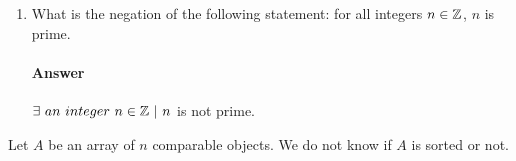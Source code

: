 \documentclass{article}
\begin{document}
\begin{enumerate}
	      \paragraph{Answer}
          \begin{proof}
	      For every integer $k \geq 1$, the complete graph on
	      $n$ vertices (denoted by the symbol~$K_n$) has $\frac{n(n-1)}{2}$~edges.
	      For each new vertex added, an edge will be connected to each existing vertex.
	      In other words, for the $n^{th}$ vertex added $n-1$ edges are added. $\frac{n(n-1)}{2}$
	      can be rewritten as $\sum^{n-1}_{k=0} k$

	      {\bf Basis:} $f(1)$ = $\frac{1 (1-1)}{2}$
	      $=\frac{1(0)}{2}$
	      $=0$

	      A graph with 1 vertex has zero edges, so this is true.

          {\bf Inductuve Step: } let $k \in \mathbb{Z}\ \|\ k_{0} = 1$ suppose that f (k) is true,
          we will show that f (k+1) is also true.

          \[ \sum^{(k+1)-1}_{j=0} j = ( \sum^{k-1}_{j=0} j ) + k\]
          \[= \frac{k(k-1)}{2} + (k)\]
          \[= \frac{k(k-1)}{2} + \frac{2(k)}{2}\]
          \[= \frac{k^2 -k + 2k}{2}\]
          \[= \frac{k^2 + k}{2} \]

          The other side of the equation is

          \[
              \frac{(k+1)((k+1)-1)}{2} = \frac{k^2 +k}{2}

          \]

          $\therefore f(k+1)$ is true


      \end{proof}

	\item What is the negation of the following statement: for all integers $n
		      \in {\mathbb Z}$, $n$ is prime.

	      \paragraph{Answer}
	      $\exists\ an\ integer\ n \in \Z\ |\ n$ is not prime.

\end{enumerate}


\collab{\todo{}}
Let $A$ be an array of $n$ comparable objects.  We do not know if $A$ is sorted
or not.
\end{document}
